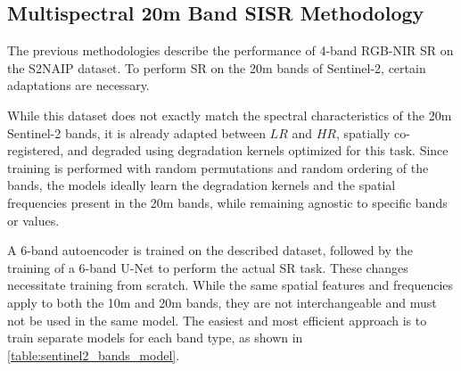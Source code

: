 \subsection{Multispectral 20m Band SISR Methodology}
The previous methodologies describe the performance of 4-band RGB-NIR SR on the S2NAIP dataset. To perform SR on the 20m bands of Sentinel-2, certain adaptations are necessary. %

While this dataset does not exactly match the spectral characteristics of the 20m Sentinel-2 bands, it is already adapted between $LR$ and $HR$, spatially co-registered, and degraded using degradation kernels optimized for this task. Since training is performed with random permutations and random ordering of the bands, the models ideally learn the degradation kernels and the spatial frequencies present in the 20m bands, while remaining agnostic to specific bands or values.

A 6-band autoencoder is trained on the described dataset, followed by the training of a 6-band U-Net to perform the actual SR task. These changes necessitate training from scratch.  %
While the same spatial features and frequencies apply to both the 10m and 20m bands, they are not interchangeable and must not be used in the same model. The easiest and most efficient approach is to train separate models for each band type, as shown in \autoref{table:sentinel2_bands_model}.


